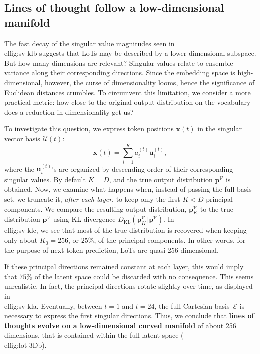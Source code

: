 \documentclass{article} %
\def\vp{{\bm{p}}}
\def\vu{{\bm{u}}}
\def\vx{{\bm{x}}}
\newcommand{\KL}{D_{\mathrm{KL}}}
\begin{document}
\subsection{Lines of thought follow a low-dimensional manifold}

The fast decay of the singular value magnitudes seen in \\ef{fig:sv-kl}b suggests that LoTs may be described by a lower-dimensional subspace.
But how many dimensions are relevant?
Singular values relate to ensemble variance along their corresponding directions. Since the embedding space is high-dimensional, however, the curse of dimensionality looms, hence the significance of Euclidean distances crumbles.
To circumvent this limitation, we consider a more practical metric: how close to the original output distribution on the vocabulary does a reduction in dimensionality get us?

To investigate this question, we express token positions $\vx(t)$ in the singular vector basis $\mathcal{U}(t)$:
\[
    \vx(t) = \sum_{i=1}^K a_{i}^{(t)} \vu_i^{(t)},
\]
where the $\vu_i^{(t)}$'s are organized by descending order of their corresponding singular values.
By default $K = D$, and the true output distribution $\vp^\mathcal{V}$ is obtained.
Now, we examine what happens when, instead of passing the full basis set, we truncate it, \textit{after each layer}, to keep only the first $K < D$ principal components.
We compare the resulting output distribution, $\mathbf{p}^\mathcal{V}_K$ to the true distribution $\mathbf{p}^\mathcal{V}$ using KL divergence $\KL ( \mathbf{p}^\mathcal{V}_K \Vert \mathbf{p}^\mathcal{V} ) $.
In \\ef{fig:sv-kl}c, we see that most of the true distribution is recovered when keeping only about $K_0 = 256$, or $25\%$, of the principal components.
In other words, for the purpose of next-token prediction, LoTs are quasi-256-dimensional.

If these principal directions remained constant at each layer, this would imply that $75\%$ of the latent space could be discarded with no consequence.
This seems unrealistic.
In fact, the principal directions rotate slightly over time, as displayed in \\ef{fig:sv-kl}a.
Eventually, between $t=1$ and $t=24$, the full Cartesian basis~$\mathcal{E}$ is necessary to express the first singular directions.
Thus, we conclude that \textbf{lines of thoughts evolve on a low-dimensional curved manifold} of about 256 dimensions, that is contained within the full latent space (\\ef{fig:lot-3D}b).
\end{document}
